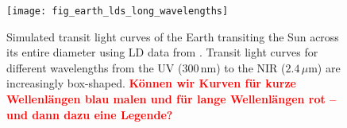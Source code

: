 \documentclass[twocolumn,tighten,longauthor]{myaastex62}
\newcommand\RH[1]{\textcolor{red}{\bf #1}}
\begin{document}
\clearpage

\begin{figure}
\texttt{[image: fig\_earth\_lds\_long\_wavelengths]}
\caption{\label{fig:wavelength}Simulated transit light curves of the Earth transiting the Sun across its entire diameter using LD data from \citet{1998A&A...333..338H}. Transit light curves for different wavelengths from the UV (300\,nm) to the NIR ($2.4\,\mu$m) are increasingly box-shaped. \RH{K{\"o}nnen wir Kurven f{\"u}r kurze Wellenl{\"a}ngen blau malen und f{\"u}r lange Wellenl{\"a}ngen rot -- und dann dazu eine Legende?}}
\end{figure}




\end{document}
